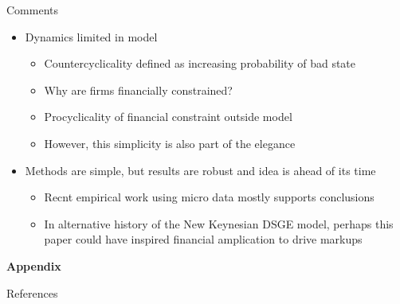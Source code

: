 \documentclass[aspectratio=169]{beamer}
\begin{document}
\begin{frame}{Comments}
    \begin{itemize}
        \item Dynamics limited in model
        \begin{itemize}
            \item Countercyclicality defined as increasing probability of bad state
            \item Why are firms financially constrained?
            \item Procyclicality of financial constraint outside model
            \item However, this simplicity is also part of the elegance
        \end{itemize}
        \vspace{0.2cm}
        \item Methods are simple, but results are robust and idea is ahead of its time
        \begin{itemize}
            \item Recnt empirical work using micro data mostly supports conclusions
            \item In alternative history of the New Keynesian DSGE model, perhaps this paper could have inspired financial amplication to drive markups
        \end{itemize}
    \end{itemize}
\end{frame}
\appendix


\begin{frame}
    \centering
    \vfill
    {\Huge\bfseries Appendix}
    \vfill
\end{frame}

\begin{frame}[allowframebreaks]{References}
    \footnotesize
    \nocite{*}
    
    
\end{frame}
\end{document}
